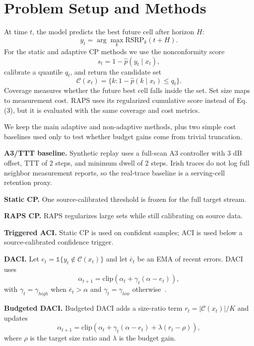 \documentclass[conference]{IEEEtran}
\begin{document}
\section{Problem Setup and Methods}

At time $t$, the model predicts the best future cell after horizon $H$:
\begin{equation}
y_t = \arg\max_k \text{RSRP}_k(t+H).
\end{equation}
For the static and adaptive CP methods we use the nonconformity score
\begin{equation}
s_t = 1 - \hat p(y_t \mid x_t),
\end{equation}
calibrate a quantile $q_t$, and return the candidate set
\begin{equation}
\mathcal{C}(x_t) = \{k : 1 - \hat p(k \mid x_t) \le q_t\}.
\end{equation}
Coverage measures whether the future best cell falls inside the set. Set size maps to measurement cost. RAPS uses its regularized cumulative score instead of Eq. (3), but it is evaluated with the same coverage and cost metrics.

We keep the main adaptive and non-adaptive methods, plus two simple cost baselines used only to test whether budget gains come from trivial truncation.

\textbf{A3/TTT baseline.} Synthetic replay uses a full-scan A3 controller with 3 dB offset, TTT of 2 steps, and minimum dwell of 2 steps. Irish traces do not log full neighbor measurement reports, so the real-trace baseline is a serving-cell retention proxy.

\textbf{Static CP.} One source-calibrated threshold is frozen for the full target stream.

\textbf{RAPS CP.} RAPS regularizes large sets while still calibrating on source data.

\textbf{Triggered ACI.} Static CP is used on confident samples; ACI is used below a source-calibrated confidence trigger.

\textbf{DACI.} Let $e_t = \mathbb{1}\{y_t \notin \mathcal{C}(x_t)\}$ and let $\bar e_t$ be an EMA of recent errors. DACI uses
\begin{equation}
\alpha_{t+1} = \text{clip}\left(\alpha_t + \gamma_t(\alpha - e_t)\right),
\end{equation}
with $\gamma_t = \gamma_{high}$ when $\bar e_t > \alpha$ and $\gamma_t = \gamma_{low}$ otherwise~\cite{gibbs2021}.

\textbf{Budgeted DACI.} Budgeted DACI adds a size-ratio term $r_t = |\mathcal{C}(x_t)| / K$ and updates
\begin{equation}
\alpha_{t+1} = \text{clip}\left(\alpha_t + \gamma_t(\alpha - e_t) + \lambda(r_t - \rho)\right),
\end{equation}
where $\rho$ is the target size ratio and $\lambda$ is the budget gain.
\end{document}
